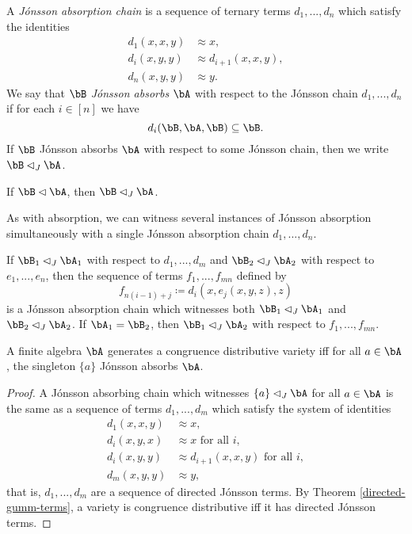 \begin{defn} A \emph{J\'onsson absorption chain} is a sequence of ternary terms $d_1, ..., d_n$ which satisfy the identities
\begin{align*}
d_1(x,x,y) &\approx x,\\
d_i(x,y,y) &\approx d_{i+1}(x,x,y),\\
d_n(x,y,y) &\approx y.
\end{align*}
We say that $\bB$ \emph{J\'onsson absorbs} $\bA$ with respect to the J\'onsson chain $d_1, ..., d_n$ if for each $i \in [n]$ we have
\[
d_i(\bB,\bA,\bB) \subseteq \bB.
\]
If $\bB$ J\'onsson absorbs $\bA$ with respect to some J\'onsson chain, then we write $\bB \lhd_J \bA$.
\end{defn}

\begin{prop} If $\bB \lhd \bA$, then $\bB \lhd_J \bA$.
\end{prop}

As with absorption, we can witness several instances of J\'onsson absorption simultaneously with a single J\'onsson absorption chain $d_1, ..., d_n$.

\begin{prop}\label{simultaneous-jonsson-absorption} If $\bB_1 \lhd_J \bA_1$ with respect to $d_1, ..., d_m$ and $\bB_2 \lhd_J \bA_2$ with respect to $e_1, ..., e_n$, then the sequence of terms $f_1, ..., f_{mn}$ defined by
\[
f_{n(i-1)+j} \coloneqq d_i(x,e_j(x,y,z),z)
\]
is a J\'onsson absorption chain which witnesses both $\bB_1 \lhd_J \bA_1$ and $\bB_2 \lhd_J \bA_2$. If $\bA_1 = \bB_2$, then $\bB_1 \lhd_J \bA_2$ with respect to $f_1, ..., f_{mn}$.
\end{prop}

\begin{cor} A finite algebra $\bA$ generates a congruence distributive variety iff for all $a \in \bA$, the singleton $\{a\}$ J\'onsson absorbs $\bA$.
\end{cor}
\begin{proof} A J\'onsson absorbing chain which witnesses $\{a\} \lhd_J \bA$ for all $a \in \bA$ is the same as a sequence of terms $d_1, ..., d_m$ which satisfy the system of identities
\begin{align*}
d_1(x,x,y) &\approx x,\\
d_i(x,y,x) &\approx x\text{ for all }i,\\
d_i(x,y,y) &\approx d_{i+1}(x,x,y)\text{ for all }i,\\
d_m(x,y,y) &\approx y,
\end{align*}
that is, $d_1, ..., d_m$ are a sequence of directed J\'onsson terms. By Theorem \ref{directed-gumm-terms}, a variety is congruence distributive iff it has directed J\'onsson terms.
\end{proof}

